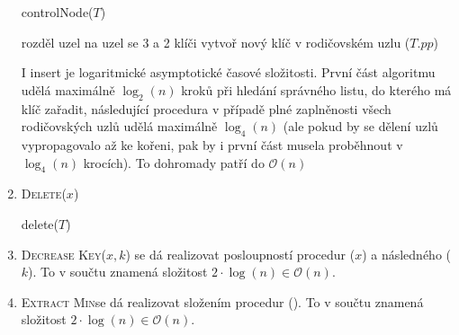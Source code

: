 \documentclass[12pt]{iv003}
\begin{document}
\begin{enumerate}
	\begin{procedure}[H]
		\caption{controlNode($T$) }
		\Output{}
		 {
			rozděl uzel na uzel se 3 a 2 klíči \;
			vytvoř nový klíč v rodičovském uzlu \;
			\ffcontrolnode($T.pp$) 
		}
	\end{procedure}
	I insert je logaritmické asymptotické časové složitosti. První část algoritmu udělá maximálně $\log_{2}(n)$ kroků při hledání správného listu, do kterého má klíč zařadit, následující procedura \ffcontrolnode v případě plné zaplněnosti všech rodičovských uzlů udělá maximálně $\log_{4}(n)$ (ale pokud by se dělení uzlů vypropagovalo až ke kořeni, pak by i první část musela proběhnout v $\log_{4}(n)$ krocích). To dohromady patří do $\mathcal{O}(n)$
	\item \textsc{Delete}($x$)
	
	\begin{procedure}[H]
		\caption{delete($T$) }
		\Output{}
	\end{procedure}
	\item \textsc{Decrease Key}($x,k$) se dá realizovat posloupností procedur \ffdelete($x$) a následného \ffinsert($k$). To v součtu znamená složitost $2\cdot \log(n) \in \mathcal{O}(n)$.
	\item \textsc{Extract Min}se dá realizovat složením procedur \ffdelete(\ffminimum). To v součtu znamená složitost $2\cdot \log(n) \in \mathcal{O}(n)$.
\end{enumerate}
\end{document}
